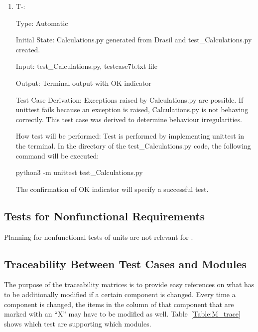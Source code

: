 \documentclass[12pt, titlepage]{article}
\newcounter{tinnum} %
\begin{document}
\begin{enumerate}

\item{T-}\thetinnum\label{T-15}:

Type: Automatic
					
Initial State: Calculations.py generated from Drasil and test\_Calculations.py 
created.
					
Input: test\_Calculations.py, testcase7b.txt file
					
Output: Terminal output with OK indicator

Test Case Derivation: Exceptions raised by Calculations.py are possible. If unittest fails because an exception is raised, Calculations.py is not behaving correctly. This test case was derived to determine behaviour irregularities.

How test will be performed: Test is performed by implementing unittest in the 
terminal. In the directory of the test\_Calculations.py code, the following 
command will be executed: 
\begin{center}
python3 -m unittest test\_Calculations.py
\end{center}

The confirmation of OK indicator will specify a successful test.
					
    
\end{enumerate}



\subsection{Tests for Nonfunctional Requirements}

Planning for nonfunctional tests of units are not relevant for 
\progname{}.

\subsection{Traceability Between Test Cases and Modules}

The purpose of the traceability matrices is to provide easy references on what
has to be additionally modified if a certain component is changed.  Every time a
component is changed, the items in the column of that component that are marked
with an ``X'' may have to be modified as well.  Table~\ref{Table:M_trace} shows 
which test are supporting which modules.
\end{document}
